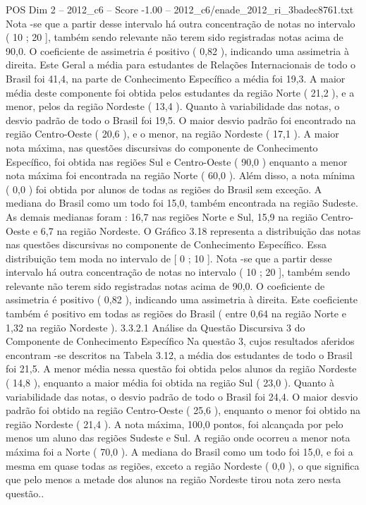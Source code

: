 \begin{textsample}{POS Dim 2 – 2012\_c6 – Score -1.00 – 2012\_c6/enade\_2012\_ri\_3badec8761.txt}
Nota -se que a partir desse intervalo há outra concentração de notas no intervalo ( 10 ; 20 ], também sendo relevante não terem sido registradas notas acima de 90,0.
O coeficiente de assimetria é positivo ( 0,82 ), indicando uma assimetria à direita.
Este Geral a média para estudantes de Relações Internacionais de todo o Brasil foi 41,4, na parte de Conhecimento Específico a média foi 19,3.
A maior média deste componente foi obtida pelos estudantes da região Norte ( 21,2 ), e a menor, pelos da região Nordeste ( 13,4 ).
Quanto à variabilidade das notas, o desvio padrão de todo o Brasil foi 19,5.
O maior desvio padrão foi encontrado na região Centro-Oeste ( 20,6 ), e o menor, na região Nordeste ( 17,1 ).
A maior nota máxima, nas questões discursivas do componente de Conhecimento Específico, foi obtida nas regiões Sul e Centro-Oeste ( 90,0 ) enquanto a menor nota máxima foi encontrada na região Norte ( 60,0 ).
Além disso, a nota mínima ( 0,0 ) foi obtida por alunos de todas as regiões do Brasil sem exceção.
A mediana do Brasil como um todo foi 15,0, também encontrada na região Sudeste.
As demais medianas foram : 16,7 nas regiões Norte e Sul, 15,9 na região Centro-Oeste e 6,7 na região Nordeste.
O Gráfico 3.18 representa a distribuição das notas nas questões discursivas no componente de Conhecimento Específico.
Essa distribuição tem moda no intervalo de [ 0 ; 10 ].
Nota -se que a partir desse intervalo há outra concentração de notas no intervalo ( 10 ; 20 ], também sendo relevante não terem sido registradas notas acima de 90,0.
O coeficiente de assimetria é positivo ( 0,82 ), indicando uma assimetria à direita.
Este coeficiente também é positivo em todas as regiões do Brasil ( entre 0,64 na região Norte e 1,32 na região Nordeste ). 3.3.2.1 Análise da Questão Discursiva 3 do Componente de Conhecimento Específico Na questão 3, cujos resultados aferidos encontram -se descritos na Tabela 3.12, a média dos estudantes de todo o Brasil foi 21,5.
A menor média nessa questão foi obtida pelos alunos da região Nordeste ( 14,8 ), enquanto a maior média foi obtida na região Sul ( 23,0 ).
Quanto à variabilidade das notas, o desvio padrão de todo o Brasil foi 24,4.
O maior desvio padrão foi obtido na região Centro-Oeste ( 25,6 ), enquanto o menor foi obtido na região Nordeste ( 21,4 ).
A nota máxima, 100,0 pontos, foi alcançada por pelo menos um aluno das regiões Sudeste e Sul.
A região onde ocorreu a menor nota máxima foi a Norte ( 70,0 ).
A mediana do Brasil como um todo foi 15,0, e foi a mesma em quase todas as regiões, exceto a região Nordeste ( 0,0 ), o que significa que pelo menos a metade dos alunos na região Nordeste tirou nota zero nesta questão..

\end{textsample}

